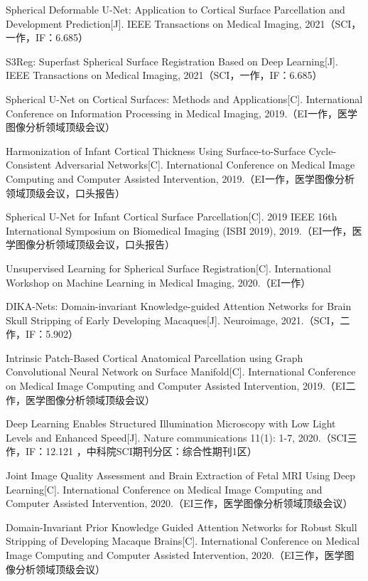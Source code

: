 \cleardoublepage
{}


\noindent [1] Spherical Deformable U-Net: Application to Cortical Surface Parcellation and Development Prediction[J]. IEEE Transactions on Medical Imaging, 2021（SCI，一作，IF：6.685）

\noindent [2] S3Reg: Superfast Spherical Surface Registration Based on Deep Learning[J]. IEEE Transactions on Medical Imaging, 2021（SCI，一作，IF：6.685）

\noindent [3] Spherical U-Net on Cortical Surfaces: Methods and Applications[C]. International Conference on Information Processing in Medical Imaging, 2019.（EI一作，医学图像分析领域顶级会议）

\noindent [4] Harmonization of Infant Cortical Thickness Using Surface-to-Surface Cycle-Consistent Adversarial Networks[C]. International Conference on Medical Image Computing and Computer Assisted Intervention, 2019.（EI一作，医学图像分析领域顶级会议，口头报告）

\noindent [5] Spherical U-Net for Infant Cortical Surface Parcellation[C]. 2019 IEEE 16th International Symposium on Biomedical Imaging (ISBI 2019), 2019.（EI一作，医学图像分析领域顶级会议，口头报告）

\noindent [6] Unsupervised Learning for Spherical Surface Registration[C]. International Workshop on Machine Learning in Medical Imaging, 2020.（EI一作）

\noindent [7] DIKA-Nets: Domain-invariant Knowledge-guided Attention Networks for Brain Skull Stripping of Early Developing Macaques[J]. Neuroimage, 2021.（SCI，二作，IF：5.902） 

\noindent [8] Intrinsic Patch-Based Cortical Anatomical Parcellation using Graph Convolutional Neural Network on Surface Manifold[C]. International Conference on Medical Image Computing and Computer Assisted Intervention, 2019.（EI二作，医学图像分析领域顶级会议）

\noindent [9] Deep Learning Enables Structured Illumination Microscopy with Low Light Levels and Enhanced Speed[J]. Nature communications 11(1): 1-7, 2020.（SCI三作，IF：12.121 ，中科院SCI期刊分区：综合性期刊1区）

\noindent [10] Joint Image Quality Assessment and Brain Extraction of Fetal MRI Using Deep Learning[C]. International Conference on Medical Image Computing and Computer Assisted Intervention, 2020.（EI三作，医学图像分析领域顶级会议）

\noindent [11] Domain-Invariant Prior Knowledge Guided Attention Networks for Robust Skull Stripping of Developing Macaque Brains[C]. International Conference on Medical Image Computing and Computer Assisted Intervention, 2020.（EI三作，医学图像分析领域顶级会议）

